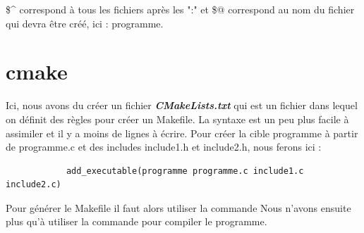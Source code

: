 \documentclass[12]{report}
\begin{document}
		\$\^{} correspond à tous les fichiers après les ":" et \$@ correspond au nom du fichier qui devra être créé, ici : programme.
		\section{cmake}
		Ici, nous avons du créer un fichier \textbf{\emph{CMakeLists.txt}} qui est un fichier dans lequel on définit des règles
		pour créer un Makefile. La syntaxe est un peu plus facile à assimiler et il y a moins de lignes à écrire.
		Pour créer la cible programme à partir de programme.c et des includes include1.h et include2.h, nous ferons ici :
		\begin{lstlisting}
			add_executable(programme programme.c include1.c include2.c)
		\end{lstlisting}
		Pour générer le Makefile il faut alors utiliser la commande 
		Nous n'avons ensuite plus qu'à utiliser la commande  pour compiler le programme.
\end{document}

